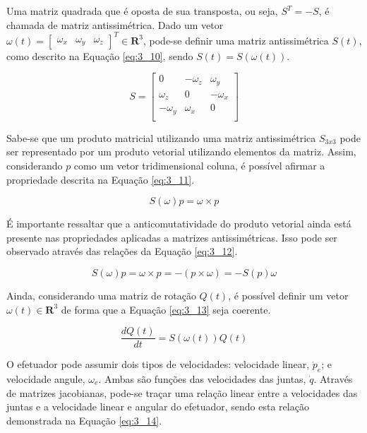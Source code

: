 Uma matriz quadrada que é oposta de sua transposta, ou seja, $S^T = -S$, é chamada de matriz antissimétrica. Dado um vetor $\omega(t) = \begin{bmatrix}\omega_x & \omega_y & \omega_z\end{bmatrix}^T \in \mathbf{R}^3$, pode-se definir uma matriz antissimétrica $S(t)$, como descrito na Equação \ref{eq:3_10}, sendo $S(t) = S(\omega(t))$.

\begin{equation}
S = 
\begin{bmatrix}
0 & -\omega_z & \omega_y\\
\omega_z & 0 & -\omega_x \\
-\omega_y & \omega_x & 0 \\
\end{bmatrix} 
\label{eq:3_10}
\end{equation}

Sabe-se que um produto matricial utilizando uma matriz antissimétrica $S_{3x3}$ pode ser representado por um produto vetorial utilizando elementos da matriz. Assim, considerando $p$ como um vetor tridimensional coluna, é possível afirmar a propriedade descrita na Equação \ref{eq:3_11}.

\begin{equation}
S(\omega)p = \omega \times p
\label{eq:3_11}
\end{equation}

É importante ressaltar que a anticomutatividade do produto vetorial ainda está presente nas propriedades aplicadas a matrizes antissimétricas. Isso pode ser observado através das relações da Equação \ref{eq:3_12}.

\begin{equation}
S(\omega)p = \omega \times p = -(p \times \omega) = -S(p)\omega
\label{eq:3_12}
\end{equation}

Ainda, considerando uma matriz de rotação $Q(t)$, é possível definir um vetor $\omega(t)\in \mathbf{R}^3$ de forma que a Equação \ref{eq:3_13} seja coerente.

\begin{equation}
\frac{dQ(t)}{dt} = S(\omega(t)) Q(t)
\label{eq:3_13}
\end{equation}

O efetuador pode assumir dois tipos de velocidades: velocidade linear, $\dot{p}_e$; e velocidade angule, $\omega_e$. Ambas são funções das velocidades das juntas, $\dot{q}$. Através de matrizes jacobianas, pode-se traçar uma relação linear entre a velocidades das juntas e a velocidade linear e angular do efetuador, sendo esta relação demonstrada na Equação \ref{eq:3_14}.

